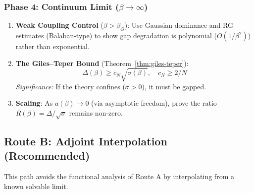 \subsubsection{Phase 4: Continuum Limit (\texorpdfstring{$\beta \to \infty$}{beta to infinity})}

\begin{enumerate}
\item \textbf{Weak Coupling Control} ($\beta > \beta_G$): 
Use Gaussian dominance and RG estimates (Balaban-type) to show gap degradation 
is polynomial ($O(1/\beta^2)$) rather than exponential.
\begin{center}
\end{center}

\item \textbf{The Giles--Teper Bound} (Theorem~\ref{thm:giles-teper}):
\[
\Delta(\beta) \geq c_N \sqrt{\sigma(\beta)}, \quad c_N \geq 2/N 
\]
\textit{Significance:} If the theory confines ($\sigma > 0$), it must be gapped.
\begin{center}
\end{center}

\item \textbf{Scaling}: As $a(\beta) \to 0$ (via asymptotic freedom), prove the 
ratio $R(\beta) = \Delta/\sqrt{\sigma}$ remains non-zero.
\begin{center}
\end{center}
\end{enumerate}

\subsection{Route B: Adjoint Interpolation (Recommended)}

This path avoids the functional analysis of Route A by interpolating from a 
known solvable limit.

